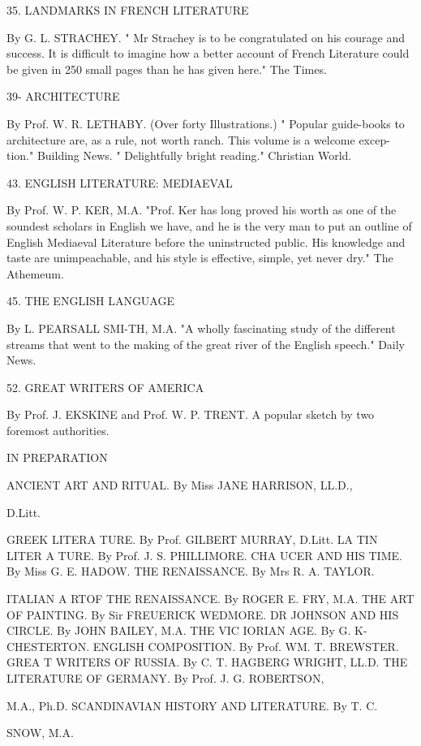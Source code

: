 \documentclass[12pt,leqno]{book}[2005/09/16]
\begin{document}
35. LANDMARKS IN FRENCH LITERATURE

By G. L. STRACHEY. " Mr Strachey is to be congratulated on his courage and
success. It is difficult to imagine how a better account of French Literature
could be given in 250 small pages than he has given here." The Times.



39- ARCHITECTURE

By Prof. W. R. LETHABY. (Over forty Illustrations.) " Popular guide-books
to architecture are, as a rule, not worth ranch. This volume is a welcome excep-
tion." Building News. " Delightfully bright reading." Christian World.

43. ENGLISH LITERATURE: MEDIAEVAL

By Prof. W. P. KER, M.A. "Prof. Ker has long proved his worth as one of
the soundest scholars in English we have, and he is the very man to put an
outline of English Mediaeval Literature before the uninstructed public. His
knowledge and taste are unimpeachable, and his style is effective, simple, yet
never dry." The Athemeum.

45. THE ENGLISH LANGUAGE

By L. PEARSALL SMI-TH, M.A. "A wholly fascinating study of the different
streams that went to the making of the great river of the English speech."
Daily News.

52. GREAT WRITERS OF AMERICA

By Prof. J. EKSKINE and Prof. W. P. TRENT. A popular sketch by two
foremost authorities.

IN PREPARATION

ANCIENT ART AND RITUAL. By Miss JANE HARRISON, LL.D.,

D.Litt.

GREEK LITERA TURE. By Prof. GILBERT MURRAY, D.Litt.
LA TIN LITER A TURE. By Prof. J. S. PHILLIMORE.
CHA UCER AND HIS TIME. By Miss G. E. HADOW.
THE RENAISSANCE. By Mrs R. A. TAYLOR.

ITALIAN A RTOF THE RENAISSANCE. By ROGER E. FRY, M.A.
THE ART OF PAINTING. By Sir FREUERICK WEDMORE.
DR JOHNSON AND HIS CIRCLE. By JOHN BAILEY, M.A.
THE VIC IORIAN AGE. By G. K- CHESTERTON.
ENGLISH COMPOSITION. By Prof. WM. T. BREWSTER.
GREA T WRITERS OF RUSSIA. By C. T. HAGBERG WRIGHT, LL.D.
THE LITERATURE OF GERMANY. By Prof. J. G. ROBERTSON,

M.A., Ph.D.
SCANDINAVIAN HISTORY AND LITERATURE. By T. C.

SNOW, M.A.
\end{document}
